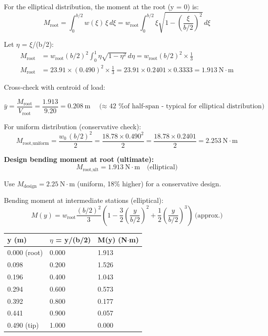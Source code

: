 \documentclass[10pt,a4paper]{article}
\begin{document}
For the elliptical distribution, the moment at the root (y = 0) is:
\[
M_{\text{root}} = \int_0^{b/2} w(\xi)\, \xi\, d\xi = w_{\text{root}} \int_0^{b/2} \xi\sqrt{1 - \left(\frac{\xi}{b/2}\right)^2}\, d\xi
\]

Let ${\eta}$ = $\xi$/(b/2):
\begin{align*}
M_{\text{root}} &= w_{\text{root}} (b/2)^2 \int_0^{1} \eta\sqrt{1-\eta^2}\, d\eta = w_{\text{root}} (b/2)^2 \times \frac{1}{3}\\
M_{\text{root}} &= 23.91 \times (0.490)^2 \times \frac{1}{3} = 23.91 \times 0.2401 \times 0.3333 = 1.913\ \text{N}\cdot\text{m}
\end{align*}

Cross-check with centroid of load:

\[
\bar{y} = \frac{M_{\text{root}}}{V_{\text{root}}} = \frac{1.913}{9.20} = 0.208\ \text{m} \quad \text{($\approx$  42 \% of half-span - typical for elliptical distribution)}
\]

For uniform distribution (conservative check):
\[
M_{\text{root,uniform}} = \frac{w_0\, (b/2)^2}{2} = \frac{18.78 \times 0.490^2}{2} = \frac{18.78 \times 0.2401}{2} = 2.253\ \text{N}\cdot\text{m}
\]

\textbf{Design bending moment at root (ultimate):}
\[
\boxed{M_{\text{root,ult}} = 1.913\ \text{N}\cdot\text{m} \quad \text{(elliptical)}}
\]

Use $M_{\text{design}} = 2.25\ \text{N}\cdot\text{m}$ (uniform, 18\% higher) for a conservative design.

Bending moment at intermediate stations (elliptical):
\[
M(y) = w_{\text{root}} \frac{(b/2)^2}{3}\left(1 - \frac{3}{2}\left(\frac{y}{b/2}\right)^2 + \frac{1}{2}\left(\frac{y}{b/2}\right)^3\right)\ \text{(approx.)}
\]

\begin{center}
\begin{tabular}{|l|l|l|}
\hline
y (m) & ${\eta}$ = y/(b/2) & M(y) (N${\cdot}$m) \\
\hline
0.000 (root) & 0.000 & 1.913 \\
\hline
0.098 & 0.200 & 1.526 \\
\hline
0.196 & 0.400 & 1.043 \\
\hline
0.294 & 0.600 & 0.573 \\
\hline
0.392 & 0.800 & 0.177 \\
\hline
0.441 & 0.900 & 0.057 \\
\hline
0.490 (tip) & 1.000 & 0.000 \\
\hline
\end{tabular}
\end{center}
\end{document}
